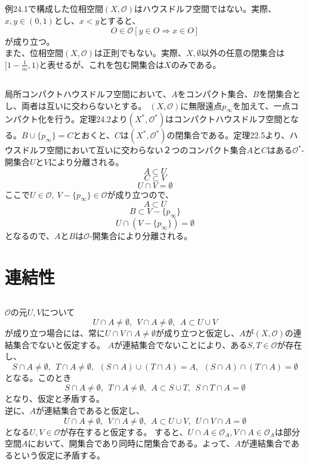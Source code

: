 \documentclass{jsarticle}
\begin{document}
\subsection{}
例24.1で構成した位相空間$(X,\mathcal{O})$はハウスドルフ空間ではない。実際、$x,y\in(0,1)$とし、$x<y$とすると、
\[O\in\mathcal{O}[y\in O\Rightarrow x\in O]\]
が成り立つ。\\
また、位相空間$(X,\mathcal{O})$は正則でもない。実際、$X,\emptyset$以外の任意の閉集合は$[1-\frac{1}{m},1)$と表せるが、これを包む開集合は$X$のみである。


\subsection{}
局所コンパクトハウスドルフ空間において、$A$をコンパクト集合、$B$を閉集合とし、両者は互いに交わらないとする。
$(X,\mathcal{O})$に無限遠点$p_\infty$を加えて、一点コンパクト化を行う。定理24.2より$(X^*,\mathcal{O}^*)$はコンパクトハウスドルフ空間となる。$B\cup\{ p_\infty\}=C$とおくと、$C$は$(X^*, \mathcal{O}^*)$の閉集合である。定理22.5より、ハウスドルフ空間において互いに交わらない２つのコンパクト集合$A$と$C$はある$\mathcal{O}^*$-開集合$U$と$V$により分離される。
\[A\subset U\]
\[C\subset V\]
\[U\cap V=\emptyset\]
ここで$U\in\mathcal{O},\ V-\{p_\infty\}\in\mathcal{O}$が成り立つので、
\[A\subset U\]
\[B\subset V-\{p_\infty\}\]
\[U\cap(V-\{p_\infty\})=\emptyset\]
となるので、$A$と$B$は$\mathcal{O}$-開集合により分離される。









\section{連結性}

\subsection{}
$\mathcal{O}$の元$U,V$について
\[U\cap A\neq \emptyset,\ \ V\cap A\neq\emptyset,\ \ A\subset U\cup V\]
が成り立つ場合には、常に$U\cap V\cap A\neq \emptyset$が成り立つと仮定し、$A$が$(X,\mathcal{O})$の連結集合でないと仮定する。
$A$が連結集合でないことにより、ある$S,T\in \mathcal{O}$が存在し、
\[S\cap A\neq\emptyset,\ \  T\cap A\neq\emptyset,\ \ (S\cap A)\cup (T\cap A)=A,\ \ (S\cap A)\cap (T\cap A)=\emptyset\]
となる。このとき
\[S\cap A\neq \emptyset,\ \ T\cap A\neq\emptyset,\ \ A\subset S\cup T,\ \ S\cap T\cap A= \emptyset\]
となり、仮定と矛盾する。\\
逆に、$A$が連結集合であると仮定し、
\[U\cap A\neq \emptyset,\ \ V\cap A\neq\emptyset,\ \ A\subset U\cup V,\ \ U\cap V\cap A= \emptyset\]
となる$U,V\in\mathcal{O}$が存在すると仮定する。
すると、$U\cap A\in\mathcal{O}_A, V\cap A\in\mathcal{O}_A$は部分空間$A$において、開集合であり同時に閉集合である。よって、$A$が連結集合であるという仮定に矛盾する。
\end{document}

